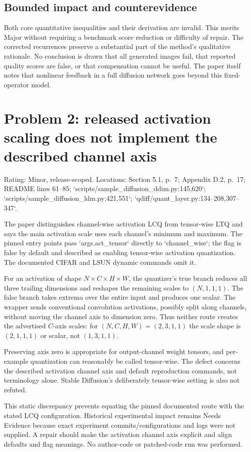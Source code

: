 \documentclass[10pt]{article}
\begin{document}
\subsection*{Bounded impact and counterevidence}
Both core quantitative inequalities and their derivation are invalid. This merits Major without requiring a benchmark score reduction or difficulty of repair. The corrected recurrences preserve a substantial part of the method’s qualitative rationale. No conclusion is drawn that all generated images fail, that reported quality scores are false, or that compensation cannot be useful. The paper itself notes that nonlinear feedback in a full diffusion network goes beyond this fixed-operator model.\par
\section*{Problem 2: released activation scaling does not implement the described channel axis}
Rating: Minor, release-scoped. Locations: Section 5.1, p. 7; Appendix D.2, p. 17; README lines 61–85; `scripts/sample\_diffusion\_ddim.py:145,620`; `scripts/sample\_diffusion\_ldm.py:421,551`; `qdiff/quant\_layer.py:134--208,307--347`.\par
The paper distinguishes channel-wise activation LCQ from tensor-wise LTQ and says the main activation scale uses each channel’s minimum and maximum. The pinned entry points pass `args.act\_tensor` directly to `channel\_wise`; the flag is false by default and described as enabling tensor-wise activation quantization. The documented CIFAR and LSUN dynamic commands omit it.\par
For an activation of shape \(N\times C\times H\times W\), the quantizer’s true branch reduces all three trailing dimensions and reshapes the remaining scales to \((N,1,1,1)\). The false branch takes extrema over the entire input and produces one scalar. The wrapper sends conventional convolution activations, possibly split along channels, without moving the channel axis to dimension zero. Thus neither route creates the advertised \(C\)-axis scales: for \((N,C,H,W)=(2,3,1,1)\) the scale shape is \((2,1,1,1)\) or scalar, not \((1,3,1,1)\).\par
Preserving axis zero is appropriate for output-channel weight tensors, and per-example quantization can reasonably be called tensor-wise. The defect concerns the described activation channel axis and default reproduction commands, not terminology alone. Stable Diffusion’s deliberately tensor-wise setting is also not refuted.\par
This static discrepancy prevents equating the pinned documented route with the stated LCQ configuration. Historical experimental impact remains Needs Evidence because exact experiment commits/configurations and logs were not supplied. A repair should make the activation channel axis explicit and align defaults and flag meanings. No author-code or patched-code run was performed.\par
\end{document}
